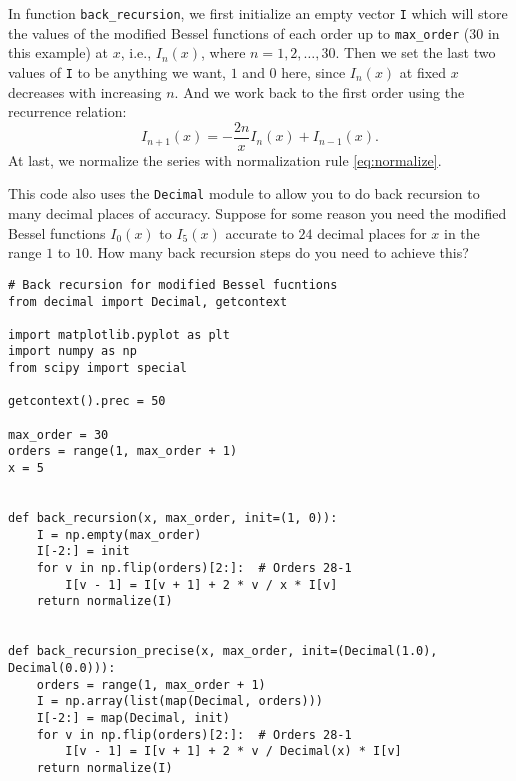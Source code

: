 In function \texttt{back\_recursion}, we first initialize an empty vector \texttt{I} which
will store the values of the modified Bessel functions of each order up to
\texttt{max\_order} ($30$ in this example) at $x$, i.e., $I_n(x)$, where
$n = 1, 2, \ldots, 30$.
Then we set the last two values of \texttt{I} to be anything we want, $1$ and $0$ here,
since $I_n(x)$ at fixed $x$ decreases with increasing $n$.
And we work back to the first order using the recurrence relation:
%
\begin{equation}
    I_{n + 1}(x) = -\frac{ 2 n }{ x } I_n(x) + I_{n - 1}(x).
\end{equation}
%
At last, we normalize the series with normalization rule \eqref{eq:normalize}.


\Question This code also uses the \texttt{Decimal} module to allow you to do back recursion to many
decimal places of accuracy. Suppose for some reason you need the modified Bessel functions
$I_0(x)$ to $I_5(x)$ accurate to $24$ decimal places for $x$ in the range $1$ to $10$. How
many back recursion steps do you need to achieve this?

\begin{verbatim}
# Back recursion for modified Bessel fucntions
from decimal import Decimal, getcontext

import matplotlib.pyplot as plt
import numpy as np
from scipy import special

getcontext().prec = 50

max_order = 30
orders = range(1, max_order + 1)
x = 5


def back_recursion(x, max_order, init=(1, 0)):
    I = np.empty(max_order)
    I[-2:] = init
    for v in np.flip(orders)[2:]:  # Orders 28-1
        I[v - 1] = I[v + 1] + 2 * v / x * I[v]
    return normalize(I)


def back_recursion_precise(x, max_order, init=(Decimal(1.0), Decimal(0.0))):
    orders = range(1, max_order + 1)
    I = np.array(list(map(Decimal, orders)))
    I[-2:] = map(Decimal, init)
    for v in np.flip(orders)[2:]:  # Orders 28-1
        I[v - 1] = I[v + 1] + 2 * v / Decimal(x) * I[v]
    return normalize(I)
\end{verbatim}
